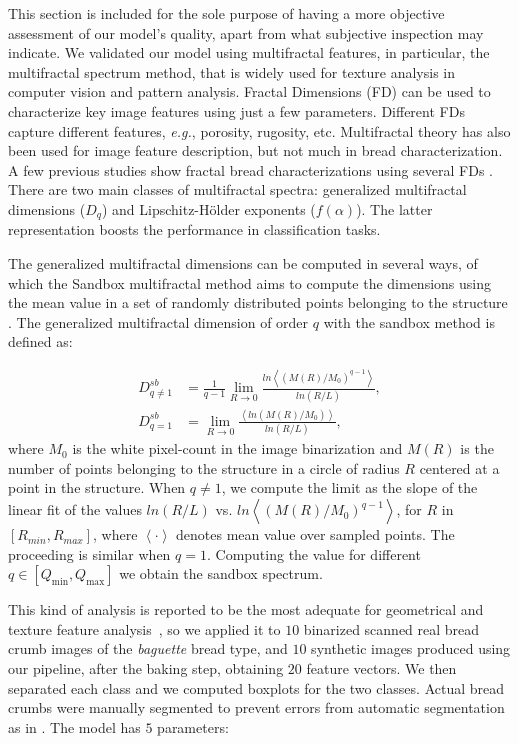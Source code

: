 \documentclass[spanish,a4paper,11pt,oneside,links]{report}
\begin{document}
This section is included for the sole purpose of having a more objective assessment of our model's quality, apart from what subjective inspection may indicate. 
We validated our model using multifractal features, in particular, the multifractal spectrum method, that is widely used for texture analysis in computer vision and pattern analysis.
Fractal Dimensions (FD) can be used to characterize key image features using just a few parameters. 
Different FDs capture different features, {\em e.g.}, porosity, rugosity, etc.
Multifractal theory has also been used for image feature description, but not much in bread characterization. 
A few previous studies show fractal bread characterizations using several FDs \cite{Gonzales2008,Baravalle2012}. 
There are two main classes of multifractal spectra: generalized multifractal dimensions ($D_{q}$) and Lipschitz-H\"older exponents ($f(\alpha)$). 
The latter representation boosts the performance in classification tasks.

The generalized multifractal dimensions can be computed in several ways, of which the Sandbox multifractal method \cite{Tel1989} aims to compute the dimensions using the mean value in a set of randomly distributed points belonging to the structure \cite{Debartolo2004}. 
The generalized multifractal dimension of order $q$ with the sandbox method is defined as:

 \begin{align*}
D_{q\ne 1}^{sb} &= \frac{1}{q-1} \lim_{R \rightarrow 0}{
\frac{ln   { \left\langle  (M(R)/M_{0})^{q-1} \right\rangle   }}
{ln {(R/L)}       }},\\
D_{q=1}^{sb} &= \lim_{R \rightarrow 0}{
\frac{ \left\langle ln   { (M(R)/M_{0})  }  \right\rangle}
{ln {(R/L)}       }},
\end{align*}
%
where $M_{0}$ is the white pixel-count in the image binarization and  $M(R)$ is the number of points belonging to the structure in a circle of radius $R$ centered at a point in the structure. 
When $q\ne1$, we compute the limit as the slope of the linear fit of the values $ln(R/L)$ vs. $ ln  \left\langle  { (M(R)/M_{0})^{q-1} }  \right\rangle$, for $R$ in $[R_{min}, R_{max}]$, where $ \left\langle \cdot  \right\rangle$ denotes mean value over sampled points. 
The proceeding is similar when $q=1$. 
Computing the value for different $q \in [Q_{\min},Q_{\max}]$  we obtain the sandbox spectrum. %

This kind of analysis is reported to be the most adequate for geometrical and texture feature analysis~\cite{Gonzales2008,Baravalle2012}, so we applied it to $10$ binarized scanned real bread crumb images of the {\em baguette} bread type, and $10$ synthetic images produced using our pipeline, after the baking step, obtaining $20$ feature vectors.
We then separated each class and we computed boxplots for the two classes.
Actual bread crumbs were manually segmented to prevent errors from automatic segmentation as in \cite{Bosch2011}.
The model has $5$ parameters:
\end{document}
